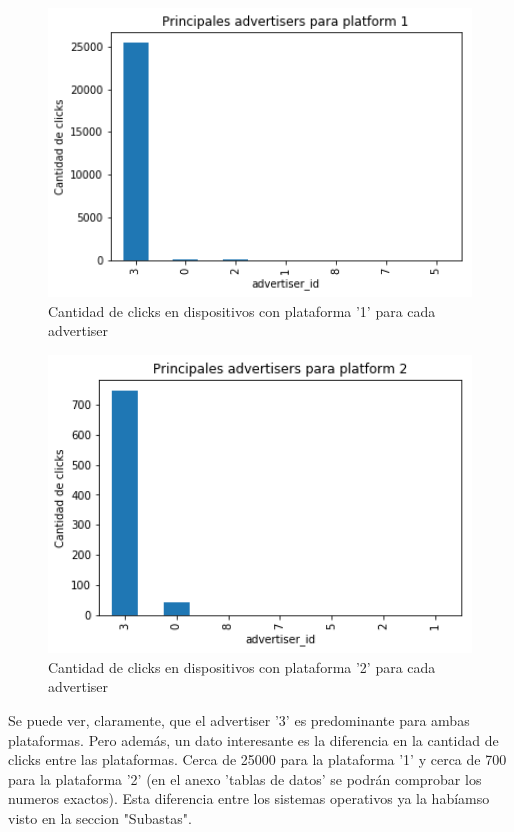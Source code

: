 \documentclass[a4paper, 12pt]{article}
\newcommand\tab[1][1cm]{\hspace*{#1}}
\begin{document}
	\FloatBarrier
		\begin{figure}[h]
			\centering
			\includegraphics[width=350pt]{images/auctions-clicks/advporSO.png}
			\caption{Cantidad de clicks en dispositivos con plataforma '1' para cada advertiser}
			\label{advporSO}
		\end{figure}

		\begin{figure}[h]
			\centering
			\includegraphics[width=350pt]{images/auctions-clicks/advporSO2.png}
			\caption{Cantidad de clicks en dispositivos con plataforma '2' para cada advertiser}
			\label{advporSO2}
		\end{figure}
	\FloatBarrier

	\tab Se puede ver, claramente, que el advertiser '3' es predominante para ambas plataformas. Pero además, un dato interesante es la diferencia en la cantidad de clicks entre las plataformas. Cerca de 25000 para la plataforma '1' y cerca de 700 para la plataforma '2' (en el anexo 'tablas de datos' se podrán comprobar los numeros exactos). Esta diferencia entre los sistemas operativos ya la habíamso visto en la seccion "Subastas".
\end{document}

